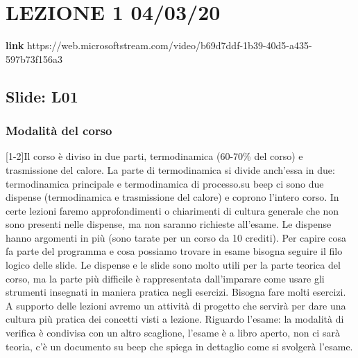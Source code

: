 \section{LEZIONE 1 04/03/20}
\textbf{link} https://web.microsoftstream.com/video/b69d7ddf-1b39-40d5-a435-597b73f156a3 
\subsection{Slide: L01}
\subsubsection{Modalità del corso}
[1-2]\newline
[3] Il corso è diviso in due parti, termodinamica (60-70\% del corso) e trasmissione del calore. La parte di termodinamica si divide anch'essa in due: termodinamica principale e termodinamica di processo.\newline
[4] su beep ci sono due dispense (termodinamica e trasmissione del calore) e coprono l'intero corso. In certe lezioni faremo approfondimenti o chiarimenti di cultura generale che non sono presenti nelle dispense, ma non saranno richieste all'esame. Le dispense hanno argomenti in più (sono tarate per un corso da 10 crediti). Per capire cosa fa parte del programma e cosa possiamo trovare in esame bisogna seguire il filo logico delle slide. Le dispense e le slide sono molto utili per la parte teorica del corso, ma la parte più difficile è rappresentata dall'imparare come usare gli strumenti insegnati in maniera pratica negli esercizi. Bisogna fare molti esercizi. A supporto delle lezioni avremo un attività di progetto che servirà per dare una cultura più pratica dei concetti visti a lezione.\newline
Riguardo l'esame: la modalità di verifica è condivisa con un altro scaglione, l'esame è a libro aperto, non ci sarà teoria, c'è un documento su beep che spiega in dettaglio come si svolgerà l'esame.
